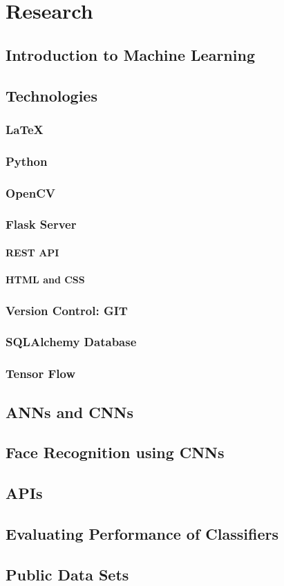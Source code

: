 \chapter{Research}
\label{research}

\section{Introduction to Machine Learning}
\section{Technologies}
	\subsection{LaTeX}
	\subsection{Python}	%
	\subsection{OpenCV}
	\subsection{Flask Server}
		\subsubsection{REST API}
		\subsubsection{HTML and CSS}
	\subsection{Version Control: GIT}	%
	\subsection{SQLAlchemy Database}
	\subsection{Tensor Flow}	%
\section{ANNs and CNNs}
\section{Face Recognition using CNNs}
\section{APIs}
\section{Evaluating Performance of Classifiers}
\section{Public Data Sets}
